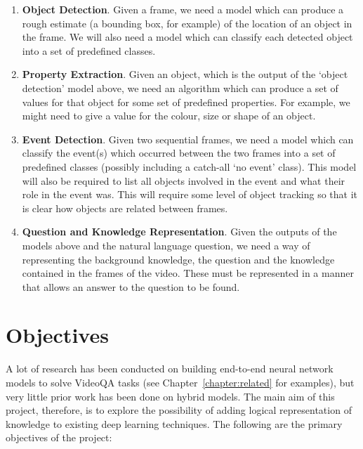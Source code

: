 \documentclass[../interim.tex]{subfiles}
\begin{document}
\begin{enumerate}
  \item \textbf{Object Detection}. Given a frame, we need a model which can produce a rough estimate (a bounding box, for example) of the location of an object in the frame. We will also need a model which can classify each detected object into a set of predefined classes.

  \item \textbf{Property Extraction}. Given an object, which is the output of the `object detection' model above, we need an algorithm which can produce a set of values for that object for some set of predefined properties. For example, we might need to give a value for the colour, size or shape of an object.

  \item \textbf{Event Detection}. Given two sequential frames, we need a model which can classify the event(s) which occurred between the two frames into a set of predefined classes (possibly including a catch-all `no event' class). This model will also be required to list all objects involved in the event and what their role in the event was. This will require some level of object tracking so that it is clear how objects are related between frames.

  \item \textbf{Question and Knowledge Representation}. Given the outputs of the models above and the natural language question, we need a way of representing the background knowledge, the question and the knowledge contained in the frames of the video. These must be represented in a manner that allows an answer to the question to be found.
\end{enumerate}


\section{Objectives}

A lot of research has been conducted on building end-to-end neural network models to solve VideoQA tasks (see Chapter~\ref{chapter:related} for examples), but very little prior work has been done on hybrid models. The main aim of this project, therefore, is to explore the possibility of adding logical representation of knowledge to existing deep learning techniques. The following are the primary objectives of the project:
\end{document}
